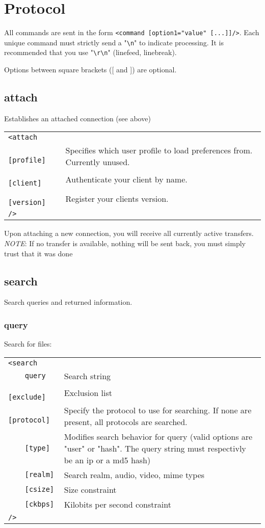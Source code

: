 \documentclass[10pt]{article}
\begin{document}
\section{Protocol}
All commands are sent in the form \verb|<command [option1="value" [...]]/>|.
Each unique command must strictly send a "\verb|\n|" to indicate processing. It
is recommended that you use "\verb|\r\n|" (linefeed, linebreak).

Options between square brackets ([ and ]) are optional.

\subsection{attach}
Establishes an attached connection (see above)

\begin{tabular}{p{2.6cm}p{8.5cm}}
\verb|<attach|          & \\
\verb|    [profile]|    & Specifies which user profile to load preferences from. Currently unused. \\
\verb|    [client]|     & Authenticate your client by name. \\
\verb|    [version]|    & Register your clients version. \\
\verb|/>|               &
\end{tabular}

Upon attaching a new connection, you will receive all currently active
transfers. \emph{NOTE}: If no transfer is available, nothing will be sent back,
you must simply trust that it was done

\subsection{search}
Search queries and returned information.

\subsubsection{query}
Search for files:

\begin{tabular}{p{2.6cm}p{8.5cm}}
\verb|<search|          &  \\
\verb|    query|            & Search string \\
\verb|    [exclude]|        & Exclusion list \\
\verb|    [protocol]|       & Specify the protocol to use for searching. If none are present, all protocols are searched. \\
\verb|    [type]|    & Modifies search behavior for query (valid options are "user" or "hash". The query string must respectivly be an ip or a md5 hash) \\
\verb|    [realm]|          & Search realm, audio, video, mime types \\
\verb|    [csize]|          & Size constraint \\
\verb|    [ckbps]|          & Kilobits per second constraint \\
\verb|/>|               &
\end{tabular}
\end{document}
